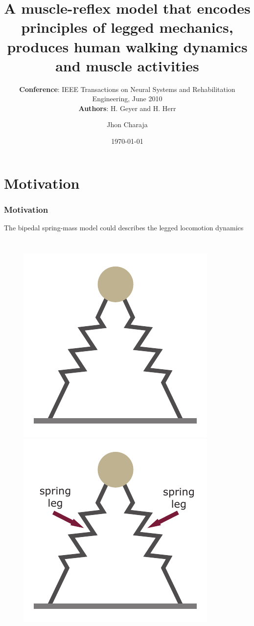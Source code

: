 \documentclass[10pt]{beamer}
\title[Article presentation]{A muscle-reflex model that encodes principles of legged mechanics, produces human walking dynamics and muscle activities}
\subtitle{
	 	\textbf{Conference}: IEEE Transactions on Neural Systems and Rehabilitation Engineering, June 2010
	\\ \textbf{Authors}: H. Geyer and H. Herr}
\author[Jhon Charaja]{Jhon Charaja\inst{1}}
\institute[USP]{
	\inst{1} Universidade de São Paulo, Brasil
}
\date{\today}
\begin{document}
\frame{\titlepage}

\section{Motivation}
\begin{frame}
	\frametitle{Motivation}
	The bipedal spring-mass model could describes the legged locomotion dynamics\footnotemark[1]
	\begin{columns}
		\begin{figure}
			\begin{overprint}
				\includegraphics[width=.9\textwidth]{images/slip/double_SLIP.pdf}
				\onslide<2>\includegraphics[width=.9\textwidth]{images/slip/double_SLIP_spring_leg.pdf}

\end{overprint}
\end{figure}
\end{columns}
\end{frame}
\end{document}
